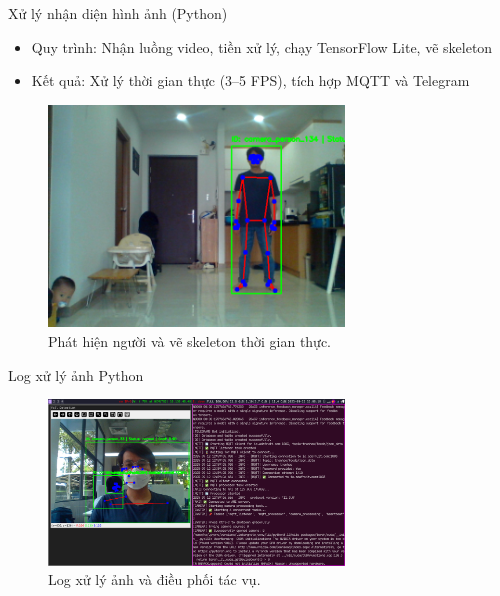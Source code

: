 \begin{frame}{Xử lý nhận diện hình ảnh (Python)}
    \begin{itemize}
        \item Quy trình: Nhận luồng video, tiền xử lý, chạy TensorFlow Lite, vẽ skeleton
        \item Kết quả: Xử lý thời gian thực (3–5 FPS), tích hợp MQTT và Telegram
    \end{itemize}
    \begin{figure}
        \centering
        \includegraphics[width=0.7\textwidth]{images/fall_detection_screen_shoot.png}
        \caption{Phát hiện người và vẽ skeleton thời gian thực.}
    \end{figure}
\end{frame}

\begin{frame}{Log xử lý ảnh Python}
    \begin{figure}
        \centering
        \includegraphics[width=0.7\textwidth]{images/python_runing_log.png}
        \caption{Log xử lý ảnh và điều phối tác vụ.}
    \end{figure}
\end{frame}

